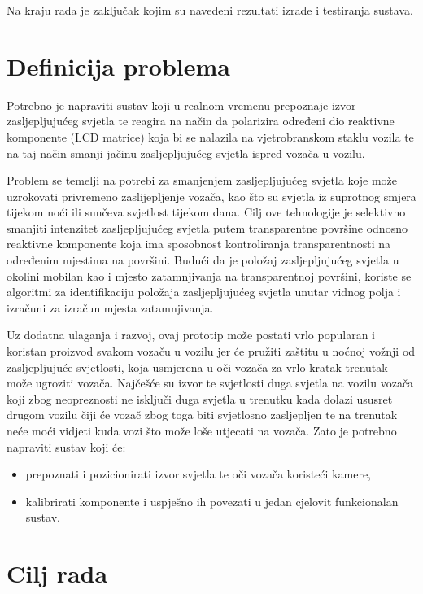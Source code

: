 \documentclass{foi}
\begin{document}
Na kraju rada je zaključak kojim su navedeni rezultati izrade i testiranja sustava.

\section{Definicija problema}

 Potrebno je napraviti sustav koji u realnom vremenu prepoznaje izvor zasljepljujućeg svjetla te reagira na način da polarizira određeni dio reaktivne komponente (LCD matrice) koja bi se nalazila na vjetrobranskom staklu vozila te na taj način smanji jačinu zasljepljujućeg svjetla ispred vozača u vozilu.

 Problem se temelji na potrebi za smanjenjem zasljepljujućeg svjetla koje može uzrokovati privremeno zaslijepljenje vozača, kao što su svjetla iz suprotnog smjera tijekom noći ili sunčeva svjetlost tijekom dana. Cilj ove tehnologije je selektivno smanjiti intenzitet zasljepljujućeg svjetla putem transparentne površine odnosno reaktivne komponente koja ima sposobnost kontroliranja transparentnosti na određenim mjestima na površini. Budući da je položaj zasljepljujućeg svjetla u okolini mobilan kao i mjesto zatamnjivanja na transparentnoj površini, koriste se algoritmi za identifikaciju položaja zasljepljujućeg svjetla unutar vidnog polja i izračuni za izračun mjesta zatamnjivanja.

Uz dodatna ulaganja i razvoj, ovaj prototip može postati vrlo popularan i koristan proizvod svakom vozaču u vozilu jer će pružiti zaštitu u noćnoj vožnji od zasljepljujuće svjetlosti, koja usmjerena u oči vozača za vrlo kratak trenutak može ugroziti vozača. Najčešće su izvor te svjetlosti duga svjetla na vozilu vozača koji zbog neopreznosti ne isključi duga svjetla u trenutku kada dolazi ususret drugom vozilu čiji će vozač zbog toga biti svjetlosno zasljepljen te na trenutak neće moći vidjeti kuda vozi što može loše utjecati na vozača. Zato je potrebno napraviti sustav koji će:
\begin{itemize}[noitemsep]
    \item prepoznati i pozicionirati izvor svjetla te oči vozača koristeći kamere,
    \item kalibrirati komponente i uspješno ih povezati u jedan cjelovit funkcionalan sustav.
\end{itemize}

\section{Cilj rada}
\end{document}
